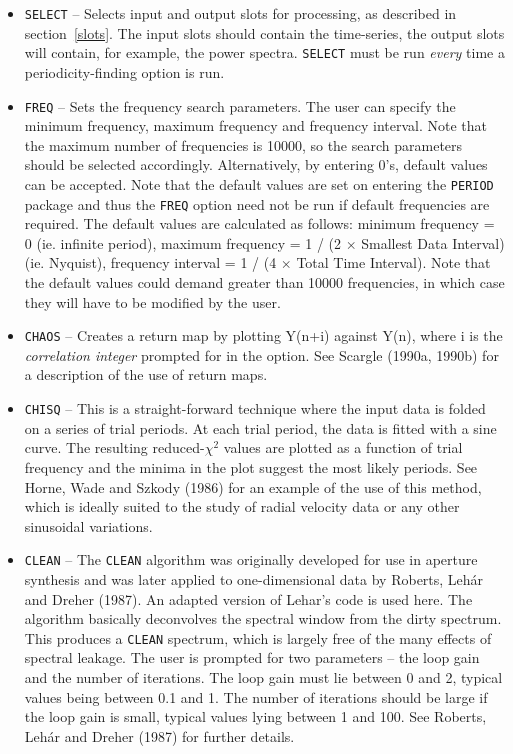 \begin{itemize}

\item {\tt SELECT} -- Selects input and output slots for processing, as
described in section~\ref{slots}. The input slots should contain the
time-series, the output slots will contain, for example, the power spectra.
{\tt SELECT} must be run {\em every} time a periodicity-finding option is run. 

\item {\tt FREQ} -- Sets the frequency search parameters. The user can specify
the minimum frequency, maximum frequency and frequency interval. Note that the
maximum number of frequencies is 10000, so the search parameters should be
selected accordingly. Alternatively, by entering 0's, default values can be
accepted. Note that the default values are set on entering the {\tt PERIOD}
package and thus the {\tt FREQ} option need not be run if default frequencies
are required. The default values are calculated as follows: minimum frequency =
0 (ie. infinite period), maximum frequency = 1 / (2 $\times$ Smallest Data
Interval) (ie. Nyquist), frequency interval = 1 / (4 $\times$ Total Time
Interval). Note that the default values could demand greater than 10000
frequencies, in which case they will have to be modified by the user. 

\item {\tt CHAOS} -- Creates a return map by plotting Y(n+i) against Y(n),
where i is the {\em correlation integer} prompted for in the option.
See Scargle (1990a, 1990b) for a description of the use of return maps. 

\item {\tt CHISQ} -- This is a straight-forward technique where the input data
is folded on a series of trial periods. At each trial period, the data is
fitted with a sine curve. The resulting reduced-$\chi^2$ values are plotted as
a function of trial frequency and the minima in the plot suggest the most
likely periods. See Horne, Wade and Szkody (1986) for an example of the use of
this method, which is ideally suited to the study of radial velocity data or
any other sinusoidal variations. 

\item {\tt CLEAN} -- The {\tt CLEAN} algorithm was originally developed for use
in aperture synthesis and was later applied to one-dimensional data by Roberts,
Leh\'{a}r and Dreher (1987). An adapted version of Lehar's code is used here. 
The algorithm basically deconvolves the spectral window from the dirty spectrum.
This produces a {\tt CLEAN} spectrum, which is largely free of the many effects
of spectral leakage. The user is prompted for two parameters -- the loop gain
and the number of iterations. The loop gain must lie between 0 and 2, typical
values being between 0.1 and 1. The number of iterations should be large if the
loop gain is small, typical values lying between 1 and 100. See Roberts,
Leh\'{a}r and Dreher (1987) for further details. 


\end{itemize}
